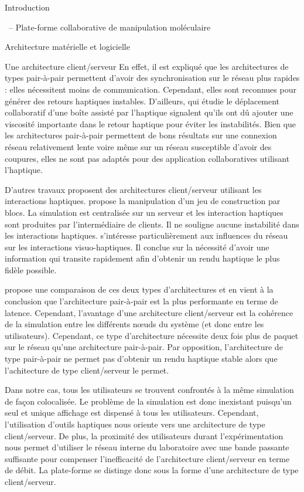 \documentclass[myfrancais]{mythesis}
\begin{document}
\begin{mypart}{Introduction}
\begin{mychapter}{\myShaddock\ -- Plate-forme collaborative de manipulation moléculaire}
\begin{mysection}{Architecture matérielle et logicielle}
\begin{mysubsection}{Une architecture client/serveur}
					En effet, il est expliqué que les architectures de types pair-à-pair permettent d'avoir des synchronisation sur le réseau plus rapides : elles nécessitent moins de communication.
					Cependant, elles sont reconnues pour générer des retours haptiques instables.
					D'ailleurs,  qui étudie le déplacement collaboratif d'une boîte assisté par l'haptique signalent qu'ils ont dû ajouter une viscosité importante dans le retour haptique pour éviter les instabilités.
					Bien que les architectures pair-à-pair permettent de bons résultats sur une connexion réseau relativement lente voire même sur un réseau susceptible d'avoir des coupures, elles ne sont pas adaptés pour des application collaboratives utilisant l'haptique.
					
					D'autres travaux proposent des architectures client/serveur utilisant les interactions haptiques.
					 propose la manipulation d'un jeu de construction par blocs.
					La simulation est centralisée sur un serveur et les interaction haptiques sont produites par l'intermédiaire de clients.
					Il ne souligne aucune instabilité dans les interactions haptiques.
					 s'intéresse particulièrement aux influences du réseau sur les interactions visuo-haptiques.
					Il conclue sur la nécessité d'avoir une information qui transite rapidement afin d'obtenir un rendu haptique le plus fidèle possible.

					 propose une comparaison de ces deux types d'architectures et en vient à la conclusion que l'architecture pair-à-pair est la plus performante en terme de latence.
					Cependant, l'avantage d'une architecture client/serveur est la cohérence de la simulation entre les différents nœuds du système (et donc entre les utilisateurs).
					Cependant, ce type d'architecture nécessite deux fois plus de paquet sur le réseau qu'une architecture pair-à-pair.
					Par opposition, l'architecture de type pair-à-pair ne permet pas d'obtenir un rendu haptique stable alors que l'achitecture de type client/serveur le permet.

					Dans notre cas, tous les utilisateurs se trouvent confrontés à la même simulation de façon colocalisée.
					Le problème de la simulation est donc inexistant puisqu'un seul et unique affichage est dispensé à tous les utilisateurs.
					Cependant, l'utilisation d'outils haptiques nous oriente vers une architecture de type client/serveur.
					De plus, la proximité des utilisateurs durant l'expérimentation nous permet d'utiliser le réseau interne du laboratoire avec une bande passante suffisante pour compenser l'inefficacité de l'architecture client/serveur en terme de débit.
					La plate-forme \myShaddock se distinge donc sous la forme d'une architecture de type client/serveur.


\end{mysubsection}
\end{mysection}
\end{mychapter}
\end{mypart}
\end{document}
